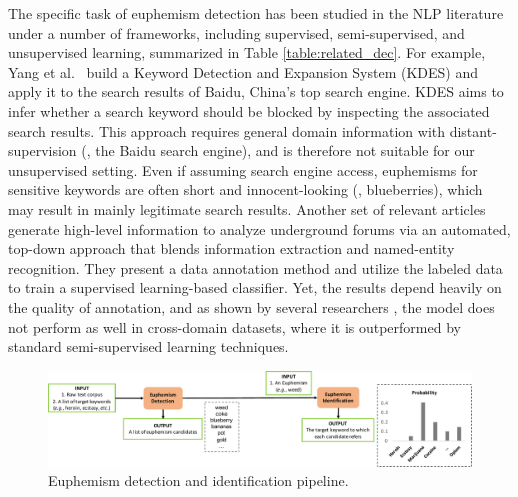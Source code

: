 The specific task of euphemism detection has been studied in the NLP literature under a number of frameworks, including supervised, semi-supervised, and unsupervised learning, summarized in Table \ref{table:related_dec}.
For example, Yang et al.\ \cite{yang2017learn} build a  Keyword Detection and Expansion System (KDES) and apply it to the search results of Baidu, China's top search engine. 
KDES aims to infer whether a search keyword should be blocked by inspecting the associated search results.
This approach requires general domain information with distant-supervision (\ie, the Baidu search engine), and is therefore not suitable for our unsupervised setting. %
Even if assuming search engine access, 
euphemisms for sensitive keywords are often short and innocent-looking (\eg, blueberries), 
which may result in mainly legitimate search results. 
Another set of relevant 
articles \cite{durrett2017identifying,portnoff2017tools} generate high-level information to analyze underground forums via an automated, 
top-down approach that blends information extraction and named-entity recognition. 
They present a data annotation method and utilize the labeled data to train a supervised learning-based
classifier. 
Yet, the results depend heavily on the quality of annotation, and as shown by several researchers \cite{durrett2017identifying,yuan2018reading}, the model does not perform as well in cross-domain datasets, 
where it is outperformed by standard  semi-supervised learning techniques. 

\begin{figure}[t]
	\centering
	\includegraphics[width=1.00\linewidth]{figures/1}
	\caption{Euphemism detection and identification pipeline.}
	\label{fig:model_overview}
\end{figure}

